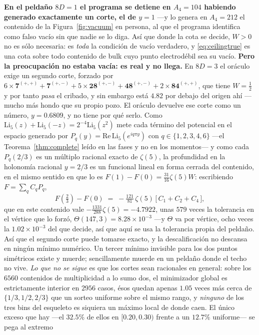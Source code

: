 \documentclass[11pt,a4paper]{article}
\newcommand{\rep}[1]{\mathbf{#1}}
\begin{document}
\textbf{En el peldaño $8D=1$ el programa se detiene en $A_4=104$ habiendo generado exactamente un
corte, el de $y=1$} ---y lo genera en $A_4=212$ el contenido de la Figura~\ref{fig:vacuum} en
persona, al que el programa identifica como falso vacío sin que nadie se lo diga. Así que donde la
cota se decide, $W>0$ no es sólo necesaria: es \emph{toda} la
condición de vacío verdadero, y \eqref{eq:ceilingtrue} es una cota sobre todo contenido de bulk cuyo
punto electrodébil sea su vacío. \textbf{Pero la preocupación no estaba vacía: es real y no
llega.} En $8D=3$ el oráculo exige un segundo corte, forzado por
$6\times\rep7^{(+,+)}+\rep7^{(+,-)}+5\times\rep{28}^{(+,-)}+\rep{48}^{(+,-)}+2\times\rep{84}^{(+,+)}$,
que tiene $W=\tfrac12$ y por tanto \emph{pasa} el cribado, y sin embargo está $4.82$ por debajo del
origen ahí ---mucho más hondo que su propio pozo. El oráculo devuelve ese corte como un número,
$y=0.6809$, y no tiene por qué serlo. Como $\mathrm{Li}_5(z)+\mathrm{Li}_5(-z)=2^{-4}\mathrm{Li}_5(z^{2})$
mete cada término del potencial en el espacio generado por $P_q(y)=\mathrm{Re}\,\mathrm{Li}_5(e^{iq\pi y})$
con $q\in\{1,2,3,4,6\}$ ---el Teorema~\ref{thm:complete} leído en las fases y no en los momentos---
y como cada $P_q(2/3)$ es un múltiplo racional exacto de $\zeta(5)$, la profundidad en la holonomía
racional $y=2/3$ es un funcional lineal en forma cerrada del contenido, en el mismo sentido en que
lo es $F(1)-F(0)=\tfrac{31}{16}\zeta(5)W$: escribiendo $F=\sum_qC_qP_q$,
\[
  F(\tfrac23)-F(0)\;=\;-\tfrac{121}{81}\,\zeta(5)\,\bigl[\,C_1+C_2+C_4\,\bigr],
\]
que en este contenido vale $-\tfrac{1331}{288}\zeta(5)=-4.7922$, unas $579$ veces la tolerancia en
el vértice que lo forzó, $\Theta(147,3)=8.28\times10^{-3}$ ---y $\Theta$ va por vértice, ocho veces
la $1.02\times10^{-3}$ del que decide, así que aquí se usa la tolerancia propia del peldaño. Así
que el segundo corte puede tomarse exacto, y la descalificación no
descansa en ningún mínimo numérico. Un tercer mínimo invisible para los dos puntos simétricos existe
y muerde; sencillamente muerde en un peldaño donde el techo no vive. \emph{Lo que no se sigue} es
que los cortes sean racionales en general: sobre los $6560$ contenidos de multiplicidad a lo sumo
dos, el minimizador global es estrictamente interior en $2956$ casos, ésos quedan apenas $1.05$
veces más cerca de $\{1/3,1/2,2/3\}$ que un sorteo uniforme sobre el mismo rango, y \emph{ninguno}
de los tres bins del esqueleto es siquiera un máximo local de donde caen. El único exceso que hay
---el $32.5\%$ de ellos en $[0.20,0.30)$ frente a un $12.7\%$ uniforme--- se pega al extremo
\end{document}

